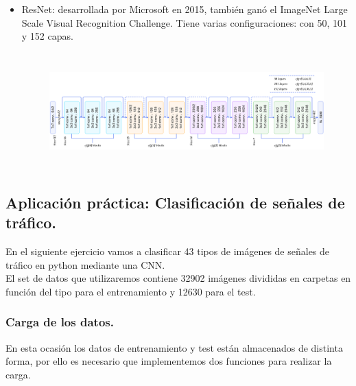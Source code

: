 \documentclass[a4paper,10pt]{article}
\begin{document}
\begin{itemize}
\begin{figure}[H]
\end{figure} 	
\item ResNet: desarrollada por Microsoft en 2015, también ganó el ImageNet Large Scale Visual Recognition Challenge. Tiene varias configuraciones: con 50, 101 y 152 capas.\begin{figure}[H]
\centering
\includegraphics[width=12.0cm, height=4.5cm]{resnet.png}
\end{figure} 	
\end{itemize}

\newpage

\subsection{Aplicación práctica: Clasificación de señales de tráfico.}
En el siguiente ejercicio vamos a clasificar 43 tipos de imágenes de señales de tráfico en python mediante una CNN. \\
El set de datos que utilizaremos contiene 32902 imágenes divididas en carpetas en función del tipo para el entrenamiento y 12630 para el test.
\subsubsection{Carga de los datos.}
En esta ocasión los datos de entrenamiento y test están almacenados de distinta forma, por ello es necesario que implementemos dos funciones para realizar la carga.
\end{document}
